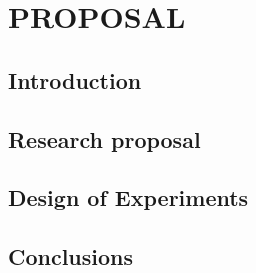 


\chapter{PROPOSAL}
\label{ch3:proposal}



\section{Introduction}
\label{ch3:Introduction}


\section{Research proposal}
\label{ch3:Propuesta}



\section{Design of Experiments}
\label{ch3:Diseño}




\section{Conclusions}
\label{ch3:conclusiones3}


\newpage
